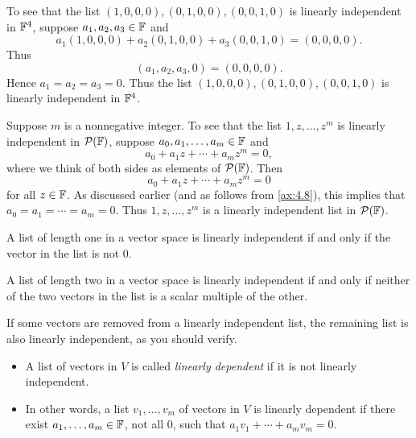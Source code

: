 \begin{example}\label{ax:2.16}\leavevmode
\begin{parts}
\item To see that the list $(1,0,0,0),(0,1,0,0),(0,0,1,0)$ is linearly
  independent in $\mathbb{F}^4$, suppose $a_1,a_2,a_3\in\mathbb{F}$ and
  \[ a_1(1,0,0,0)+a_2(0,1,0,0)+a_3(0,0,1,0) = (0,0,0,0). \]
  Thus
  \[ (a_1,a_2,a_3,0) = (0,0,0,0). \]
  Hence $a_1=a_2=a_3=0$. Thus the list $(1,0,0,0),(0,1,0,0),(0,0,1,0)$ is
  linearly independent in $\mathbb{F}^4$.
\item Suppose $m$ is a nonnegative integer. To see that the list
  $1,z,\dots,z^m$ is linearly independent in $\mathcal{P}(\mathbb{F})$, suppose
  $a_0,a_1,\dots,a_m\in\mathbb{F}$ and
  \[ a_0+a_1z+\cdots+a_mz^m = 0, \]
  where we think of both sides as elements of $\mathcal{P}(\mathbb{F})$. Then
  \[ a_0+a_1z+\cdots+a_mz^m = 0 \]
  for all $z\in\mathbb{F}$. As discussed earlier (and as follows from \ref{ax:4.8}),
  this implies that $a_0=a_1=\cdots=a_m=0$. Thus $1,z,\dots,z^m$ is a linearly
  independent list in $\mathcal{P}(\mathbb{F})$.
\item A list of length one in a vector space is linearly independent if and
  only if the vector in the list is not $0$.
\item A list of length two in a vector space is linearly independent if and
  only if neither of the two vectors in the list is a scalar multiple of the
  other.
\end{parts}
\end{example}

If some vectors are removed from a linearly independent list, the remaining
list is also linearly independent, as you should verify.

\begin{definition}\label{ax:2.17}\leavevmode
\begin{itemize}
\item A list of vectors in $V$ is called \emph{linearly dependent} if it is not
  linearly independent.
\item In other words, a list $v_1,\dots,v_m$ of vectors in $V$ is linearly
  dependent if there exist $a_1,\dots,a_m\in\mathbb{F}$, not all $0$, such that
  $a_1v_1+\cdots+a_mv_m=0$.
\end{itemize}
\end{definition}

